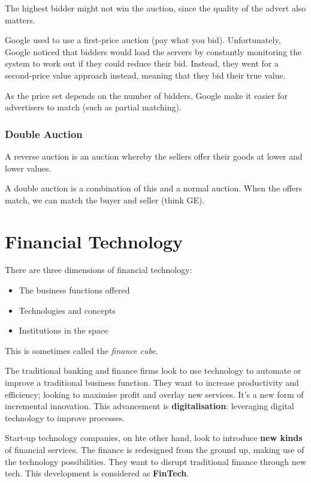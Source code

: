 \documentclass[11pt,a4paper,titlepage,dvipsnames,cmyk]{scrartcl}
\begin{document}
The highest bidder might not win the auction, since the quality of the advert also matters.

Google used to use a first-price auction (pay what you bid). Unfortunately, Google noticed that bidders would load the servers by constantly monitoring the system to work out if they could reduce their bid. Instead, they went for a second-price value approach instead, meaning that they bid their true value.

As the price set depends on the number of bidders, Google make it easier for advertisers to match (such as partial matching).

\subsubsection{Double Auction}
A reverse auction is an auction whereby the sellers offer their goods at lower and lower values.

A double auction is a combination of this and a normal auction. When the offers match, we can match the buyer and seller (think GE).

\section{Financial Technology}
There are three dimensions of financial technology:
\begin{itemize}
    \item The business functions offered
    \item Technologies and concepts
    \item Institutions in the space
\end{itemize}

This is sometimes called the \textit{finance cube}.

The traditional banking and finance firms look to use technology to automate or improve a traditional business function. They want to increase productivity and efficiency; looking to maximise profit and overlay new services. It's a new form of incremental innovation. This advancement is \textbf{digitalisation}: leveraging digital technology to improve processes.

Start-up technology companies, on hte other hand, look to introduce \textbf{new kinds} of financial services. The finance is redesigned from the ground up, making use of the technology possibilities. They want to disrupt traditional finance through new tech. This development is considered as \textbf{FinTech}.
\end{document}
